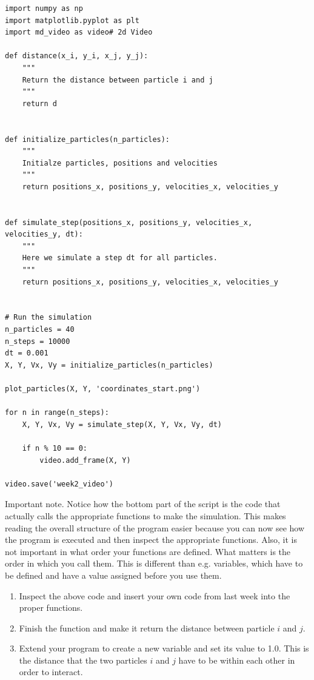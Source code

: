 \documentclass{article}
\begin{document}
\begin{lstlisting}
import numpy as np
import matplotlib.pyplot as plt
import md_video as video# 2d Video

def distance(x_i, y_i, x_j, y_j):
    """
    Return the distance between particle i and j
    """
    return d


def initialize_particles(n_particles):
    """
    Initialze particles, positions and velocities
    """
    return positions_x, positions_y, velocities_x, velocities_y


def simulate_step(positions_x, positions_y, velocities_x, velocities_y, dt):
    """
    Here we simulate a step dt for all particles.
    """
    return positions_x, positions_y, velocities_x, velocities_y


# Run the simulation
n_particles = 40
n_steps = 10000
dt = 0.001
X, Y, Vx, Vy = initialize_particles(n_particles)

plot_particles(X, Y, 'coordinates_start.png')

for n in range(n_steps):
    X, Y, Vx, Vy = simulate_step(X, Y, Vx, Vy, dt)

    if n % 10 == 0:
        video.add_frame(X, Y)

video.save('week2_video')

\end{lstlisting}

\newpage
Important note.
Notice how the bottom part of the script is the code that actually calls the
appropriate functions to make the simulation.  This makes reading the overall
structure of the program easier because you can now see how the program is
executed and then inspect the appropriate functions.  Also, it is not important
in what order your functions are defined. What matters is the order in which you
call them. This is different than e.g. variables, which have to be defined and have a value assigned before you use them.

\begin{enumerate}
  \setcounter{enumi}{0}
  \item Inspect the above code and insert your own code from last week into the proper functions.

  \item Finish the function  and make it return
    the distance  between particle $i$ and $j$.

    \item Extend your program to create a new variable  and set its
    value to 1.0.
    This is the distance that the two particles $i$ and $j$ have to be within each other
    in order to interact.

\end{enumerate}
\end{document}
